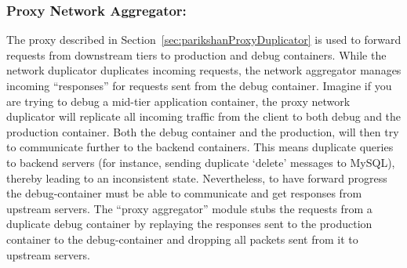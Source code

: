 \subsubsection{Proxy Network Aggregator:}
\label{sec:parikshanProxyAggregator}
The proxy described in Section~\ref{sec:parikshanProxyDuplicator} is used to forward requests from downstream tiers to production and debug containers.
While the network duplicator duplicates incoming requests, the network aggregator manages incoming ``responses'' for requests sent from the debug container. 
Imagine if you are trying to debug a mid-tier application container, the proxy network duplicator will replicate all incoming traffic from the client to both debug and the production container. 
Both the debug container and the production, will then try to communicate further to the backend containers.
This means duplicate queries to backend servers (for instance, sending duplicate `delete' messages to MySQL), thereby leading to an inconsistent state.
Nevertheless, to have forward progress the debug-container must be able to communicate and get responses from upstream servers.
The ``proxy aggregator'' module stubs the requests from a duplicate debug container by replaying the responses sent to the production container to the debug-container and dropping all packets sent from it to upstream servers.

